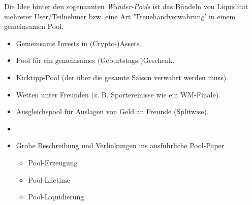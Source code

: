 
\begin{Problem}


Die Idee hinter den sogenannten \textit{Wunder-Pools} ist das Bündeln von Liquidität mehrerer User/Teilnehmer bzw. eine Art 'Treuehandverwahrung' in einem gemeinsamen Pool. 

\end{Problem}

\vspace{0.3cm}


\begin{Example}

\begin{itemize}
  \item Gemeinsame Invests in (Crypto-)Assets.
  \item Pool für ein gemeinsames (Geburtstags-)Geschenk.
  \item Kicktipp-Pool (der über die gesamte Saison verwahrt werden muss).
  \item Wetten unter Freunden (z. B. Sportereinisse wie ein WM-Finale).
  \item Ausgleichspool für Auslagen von Geld an Freunde (Splitwise).
\end{itemize}

\end{Example}

\vspace{0.3cm}


\begin{Solution}


\begin{itemize}
  \item {}
  \item Grobe Beschreibung und Verlinkungen ins ausführliche Pool-Paper
  \begin{itemize}
	\item Pool-Erzeugung
	\item Pool-Lifetime
	\item Pool-Liquidierung
  \end{itemize}
\end{itemize}


\end{Solution}

\vspace{0.3cm}


\begin{Hypothese}


\end{Hypothese}

\vspace{0.3cm}







\begin{Problem}


\end{Problem}

\vspace{0.3cm}


\vspace{0.5cm}